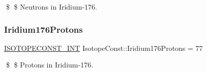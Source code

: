 \$ \$ Neutrons in Iridium-\/176. \mbox{\label{group___isotope_const-_iridium-_ir176_ga789f0eff6ce037056a4beaee39ec003c}} 
\subsubsection{\texorpdfstring{Iridium176\+Protons}{Iridium176Protons}}
{\footnotesize\ttfamily \mbox{\hyperlink{group___isotope_const-_macros_ga5f18360b3e99483a35c32d789e62621c}{I\+S\+O\+T\+O\+P\+E\+C\+O\+N\+S\+T\+\_\+\+I\+NT}} Isotope\+Const\+::\+Iridium176\+Protons = 77}

\$ \$ Protons in Iridium-\/176. 